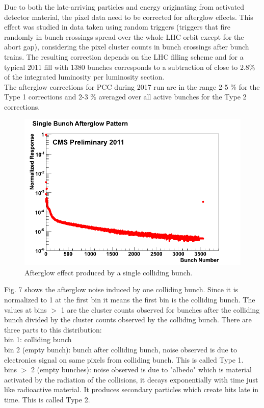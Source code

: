Due to both the late-arriving particles and energy originating from activated detector material, the pixel data need to be corrected for afterglow effects. This effect was studied in data taken using random triggers (triggers that fire randomly in bunch crossings spread over the whole LHC orbit except for the abort gap), considering the pixel cluster counts in bunch crossings after bunch trains. The resulting correction depends on the LHC filling scheme and for a typical 2011 fill with 1380 bunches corresponds to a subtraction of close to 2.8$\%$ of the integrated luminosity per luminosity section. \\

The afterglow corrections for PCC during 2017 run are in the range 2-5 $\%$ for the Type 1 corrections and 2-3 $\%$ averaged over all active bunches for the Type 2 corrections.

\begin{figure}[H]
  \centering
  \includegraphics[width=0.5\columnwidth]{./SingleBunchAfterglow.png}
  \caption{Afterglow effect produced by a single colliding bunch.}
  \label{fig:LHC}
\end{figure}


Fig. 7 shows the afterglow noise induced by one colliding bunch. Since it is normalized to 1 at the first bin it means the first bin is the colliding bunch. The values at bins $>$ 1 are the cluster counts observed for bunches after the colliding bunch divided by the cluster counts observed by the colliding bunch. There are three parts to this distribution: \\

bin 1: colliding bunch \\

bin 2 (empty bunch): bunch after colliding bunch, noise observed is due to electronics signal on same pixels from colliding bunch. This is called Type 1. \\

bins $>$ 2 (empty bunches): noise observed is due to "albedo" which is material activated by the radiation of the collisions, it decays exponentially with time just like radioactive material. It produces secondary particles which create hits late in time. This is called Type 2.

